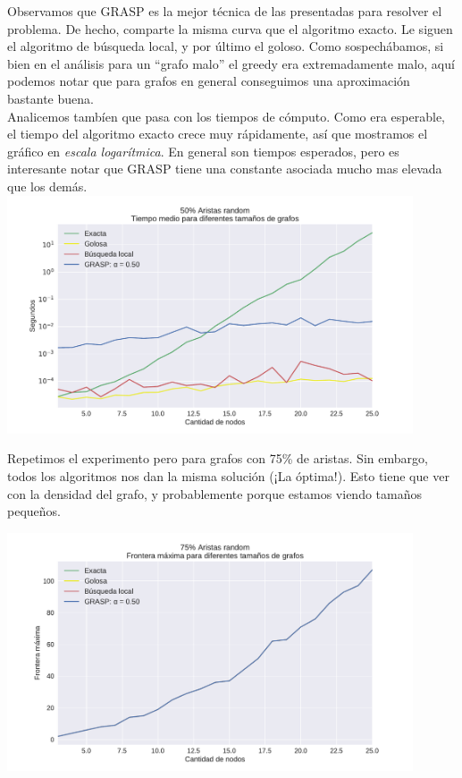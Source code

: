 Observamos que GRASP es la mejor técnica de las presentadas para resolver el problema. De hecho, comparte la misma curva que el algoritmo exacto. Le siguen el algoritmo de búsqueda local, y por último el goloso. Como sospechábamos, si bien en el análisis para un ``grafo malo'' el greedy era extremadamente malo, aquí podemos notar que para grafos en general conseguimos una aproximación bastante buena. \\

Analicemos tambíen que pasa con los tiempos de cómputo. Como era esperable, el tiempo del algoritmo exacto crece muy rápidamente, así que mostramos el gráfico en \textit{escala logarítmica}. En general son tiempos esperados, pero es interesante notar que GRASP tiene una constante asociada mucho mas elevada que los demás. \\

{\centering
    \includegraphics[width=0.9\textwidth]{informe/imgs/exp_random50_tiempo_todos_v2.pdf}
}
$ $ \newline

Repetimos el experimento pero para grafos con 75\% de aristas. Sin embargo, todos los algoritmos nos dan la misma solución (¡La óptima!). Esto tiene que ver con la densidad del grafo, y probablemente porque estamos viendo tamaños pequeños. \\

{\centering
    \includegraphics[width=0.9\textwidth]{informe/imgs/exp_random75_frontera_todos_v2.pdf}

}
$ $ \newline


